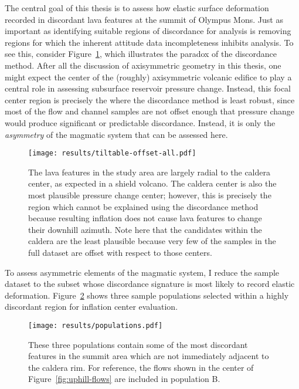 The central goal of this thesis is to assess how elastic surface deformation recorded in discordant lava features at the summit of Olympus Mons. Just as important as identifying suitable regions of discordance for analysis is removing regions for which the inherent attitude data incompleteness inhibits analysis. To see this, consider Figure~\ref{fig:tiltable-offset-all}, which illustrates the paradox of the discordance method. After all the discussion of axisymmetric geometry in this thesis, one might expect the center of the (roughly) axisymmetric volcanic edifice to play a central role in assessing subsurface reservoir pressure change. Instead, this focal center region is precisely the where the discordance method is least robust, since most of the flow and channel samples are not offset enough that pressure change would produce significant or predictable discordance. Instead, it is only the \emph{asymmetry} of the magmatic system that can be assessed here. 

\begin{figure}
    \texttt{[image: results/tiltable-offset-all.pdf]}%
    \caption[Centers by tiltable/offset fraction (all samples)]{The lava features in the study area are largely radial to the caldera center, as expected in a shield volcano. The caldera center is also the most plausible pressure change center; however, this is precisely the region which cannot be explained using the discordance method because resulting inflation does not cause lava features to change their downhill azimuth. Note here that the candidates within the caldera are the least plausible because very few of the samples in the full dataset are offset with respect to those centers.}
    \label{fig:tiltable-offset-all}
\end{figure}

To assess asymmetric elements of the magmatic system, I reduce the sample dataset to the subset whose discordance signature is most likely to record elastic deformation. Figure~\ref{fig:populations} shows three sample populations selected within a highly discordant region for inflation center evaluation.

\begin{figure}
    \texttt{[image: results/populations.pdf]}%
    \caption[Sample populations for inflation center evaluation]{These three populations contain some of the most discordant features in the summit area which are not immediately adjacent to the caldera rim. For reference, the flows shown in the center of Figure~\ref{fig:uphill-flows} are included in population B.}%
    \label{fig:populations}
\end{figure}

